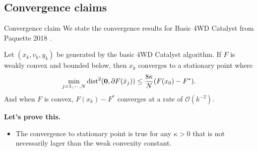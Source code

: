 \documentclass[11pt]{beamer}
\begin{document}
    \subsection{Convergence claims}
        \begin{frame}{Convergence claim}
            We state the convergence results for Basic 4WD Catalyst from Paquette 2018 \cite{paquette_catalyst_2018}. 
            \begin{theorem}
                Let $(x_k, v_k, y_k)$ be generated by the basic 4WD Catalyst algorithm. 
                If $F$ is weakly convex and bounded below, then $x_k$ converges to a stationary point where
                \begin{align*}
                    \min_{j = 1, \cdots, N} \operatorname{dist}^2(\mathbf 0, \partial F(\bar x_j))
                    \le \frac{8 \kappa}{N}(F(x_0) - F^*). 
                \end{align*}
                And when $F$ is convex, $F(x_k) - F^*$ converges at a rate of $\mathcal O(k^{-2})$. 
            \end{theorem}
            \pause
            \textbf{Let's prove this.} 
            \begin{itemize}
                \item The convergence to stationary point is true for any $\kappa > 0$ that is not necessarily lager than the weak convexity constant. 
            \end{itemize}
        \end{frame}
\end{document}
